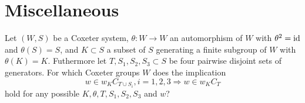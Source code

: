 \section{Miscellaneous}

\begin{ques}
	Let $(W,S)$ be a Coxeter system, $\theta : W \to W$ an automorphism of $W$ with $\theta^2 = \operatorname{id}$ and $\theta(S) = S$, and $K \subset S$ a subset of $S$ generating a finite subgroup of $W$ with $\theta(K) = K$. Futhermore let $T,S_1,S_2,S_3 \subset S$ be four pairwise disjoint sets of generators. For which Coxeter groups $W$ does the implication
	\begin{equation}
		\label{eq:main}
		w \in w_K C_{T \cup S_i}, i=1,2,3 \Rightarrow w \in w_K C_T
	\end{equation}
	hold for any possible $K,\theta,T,S_1,S_2,S_3$ and $w$?
\end{ques}


